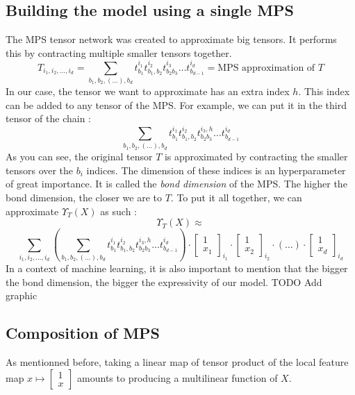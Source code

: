 \documentclass{article}
\theoremstyle{definition}
\theoremstyle{definition}
\begin{document}
\subsection{Building the model using a single MPS}
The MPS tensor network was created to approximate big tensors. It performs this by contracting multiple smaller tensors together.
\begin{equation} \label{eq:mps_approx}
T_{i_1, i_2, \dots, i_d} 
= 
\sum_{b_1,b_2,(\dots), b_d} t^{i_1}_{b_1} t^{i_2}_{b_1, b_2} t^{i_3}_{b_2 b_3} \dots  t^{i_d}_{ b_{d-1} } 
= \text{MPS approximation of $T$}
\end{equation}
In our case, the tensor we want to approximate has an extra index $h$. This index can be added to any tensor of the MPS. For example, we can put it in the third tensor of the chain :
\[
    \sum_{b_1,b_2,(\dots), b_d} t^{i_1}_{b_1} t^{i_2}_{b_1, b_2} t^{i_3, h}_{b_2 b_3} \dots  t^{i_d}_{ b_{d-1} } 
\]
As you can see, the original tensor $T$ is approximated by contracting the smaller tensors over the $b_i$ indices. The dimension of these indices is an hyperparameter of great importance. It is called the \emph{bond dimension} of the MPS. The higher the bond dimension, the closer we are to $T$. To put it all together, we can approximate $\Upsilon_T(X)$ as such :
\[
    \Upsilon_T(X) \approx
\]
\[
    \sum_{i_1, i_2, \dots, i_d}
    \left(
    \sum_{b_1,b_2,(\dots), b_d} t^{i_1}_{b_1} t^{i_2}_{b_1, b_2} t^{i_3, h}_{b_2 b_3} \dots  t^{i_d}_{ b_{d-1} } 
    \right)
    \cdot
    \begin{bmatrix}
        1 \\ x_1
    \end{bmatrix}_{i_1}
    \cdot
    \begin{bmatrix}
        1 \\ x_2
    \end{bmatrix}_{i_2}
    \cdot
    (\dots)
    \cdot
    \begin{bmatrix}
        1 \\ x_d
    \end{bmatrix}_{i_d}
\]
In a context of machine learning, it is also important to mention that the bigger the bond dimension, the bigger the expressivity of our model.
TODO Add graphic

\subsection{Composition of MPS}
As mentionned before, taking a linear map of  tensor product of the local feature map 
$ x \mapsto \begin{bmatrix} 1 \\ x \end{bmatrix} $ amounts to producing a multilinear function of $X$.
\end{document}
